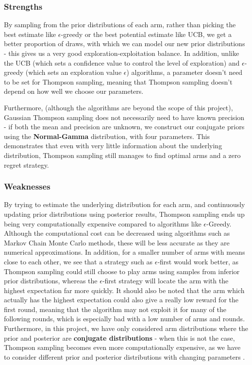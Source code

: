 \subsubsection{Strengths}
By sampling from the prior distributions of each arm, rather than picking the best estimate like $\epsilon$-greedy or the best potential estimate like UCB, we get a better proportion of draws, with which we can model our new prior distributions - this gives us a very good exploration-exploitation balance. In addition, unlike the UCB (which sets a confidence value to control the level of exploration) and $\epsilon$-greedy (which sets an exploration value $\epsilon$) algorithms, a parameter doesn't need to be set for Thompson sampling, meaning that Thompson sampling doesn't depend on how well we choose our parameters. 

Furthermore, (although the algorithms are beyond the scope of this project), Gaussian Thompson sampling does not necessarily need to have known precision - if both the mean and precision are unknown, we construct our conjugate priors using the \textbf{Normal-Gamma} distribution, with four parameters. This demonstrates that even with very little information about the underlying distribution, Thompson sampling still manages to find optimal arms and a zero regret strategy. 

\subsubsection{Weaknesses}
By trying to estimate the underlying distribution for each arm, and continuously updating prior distributions using posterior results, Thompson sampling ends up being very computationally expensive compared to algorithms like $\epsilon$-Greedy. \citep{mazumdar2020thompson} Although the computational cost can be decreased using algorithms such as Markov Chain Monte Carlo methods, these will be less accurate as they are numerical approximations. \citep{mazumdar2020thompson} In addition, for a smaller number of arms with means close to each other, we see that a strategy such as $\epsilon$-first would work better, as Thompson sampling could still choose to play arms using samples from inferior prior distributions, whereas the $\epsilon$-first strategy will locate the arm with the highest expectation far more quickly. It should also be noted that the arm which actually has the highest expectation could also give a really low reward for the first round, meaning that the algorithm may not exploit it for many of the following rounds, which is especially bad with a low number of arms and rounds. Furthermore, in this project, we have only considered arm distributions where the prior and posterior are \textbf{conjugate distributions} - when this is not the case, Thompson sampling becomes even more computationally expensive, as we have to consider different prior and posterior distributions with changing parameters \citep{zhou2018racing}.

